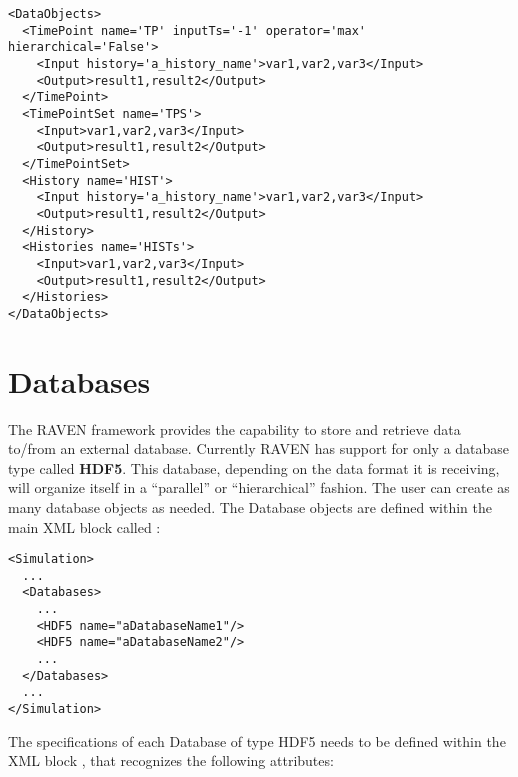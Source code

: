 \begin{lstlisting}[style=XML,morekeywords={inputTs,operator,hierarchical,name,history}]
<DataObjects>
  <TimePoint name='TP' inputTs='-1' operator='max' hierarchical='False'>
    <Input history='a_history_name'>var1,var2,var3</Input>
    <Output>result1,result2</Output>
  </TimePoint>
  <TimePointSet name='TPS'>
    <Input>var1,var2,var3</Input>
    <Output>result1,result2</Output>
  </TimePointSet>
  <History name='HIST'>
    <Input history='a_history_name'>var1,var2,var3</Input>
    <Output>result1,result2</Output>
  </History>
  <Histories name='HISTs'>
    <Input>var1,var2,var3</Input>
    <Output>result1,result2</Output>
  </Histories>
</DataObjects>
\end{lstlisting}

\section{Databases}
\label{sec:Databases}
The RAVEN framework provides the capability to store and retrieve data to/from
an external database.
%
Currently RAVEN has support for only a database type called \textbf{HDF5}.
%
This database, depending on the data format it is receiving, will organize
itself in a ``parallel'' or ``hierarchical'' fashion.
%
The user can create as many database objects as needed.
%
The Database objects are defined within the main XML block called
:
\begin{lstlisting}[style=XML]
<Simulation>
  ...
  <Databases>
    ...
    <HDF5 name="aDatabaseName1"/>
    <HDF5 name="aDatabaseName2"/>
    ...
  </Databases>
  ...
</Simulation>
\end{lstlisting}
The specifications of each Database of type HDF5 needs to be defined within the
XML block , that recognizes the following attributes:
\vspace{-5mm}

